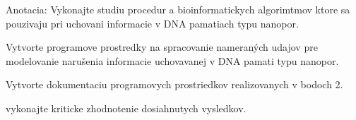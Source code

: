Anotacia:
Vykonajte studiu procedur a bioinformatickych algorimtmov ktore sa pouzivaju pri uchovani informacie v  DNA pamatiach typu nanopor.

Vytvorte programove prostredky na spracovanie nameraných udajov pre modelovanie narušenia informacie uchovavanej v DNA pamati typu nanopor.

Vytvorte dokumentaciu programovych prostriedkov realizovanych v bodoch 2.

vykonajte kriticke zhodnotenie dosiahnutych vysledkov.

